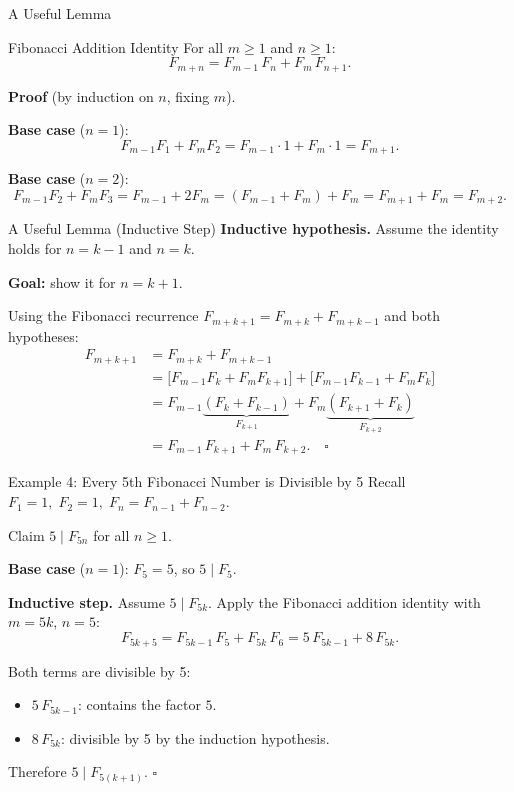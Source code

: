 \documentclass[10pt,aspectratio=169]{beamer}
\begin{document}
\begin{frame}{A Useful Lemma}
  \begin{block}{Fibonacci Addition Identity}
    For all $m \ge 1$ and $n \ge 1$:
    \[
      F_{m+n} = F_{m-1}\,F_n + F_m\,F_{n+1}.
    \]
  \end{block}

  \bigskip
  \textbf{Proof} (by induction on $n$, fixing $m$).

  \bigskip
  \textbf{Base case} ($n = 1$):
  \[
    F_{m-1}F_1 + F_m F_2 = F_{m-1} \cdot 1 + F_m \cdot 1 = F_{m+1}.
  \]

  \textbf{Base case} ($n = 2$):
  \[
    F_{m-1}F_2 + F_m F_3 = F_{m-1} + 2F_m = (F_{m-1}+F_m)+F_m = F_{m+1}+F_m = F_{m+2}.
  \]
\end{frame}

\begin{frame}{A Useful Lemma (Inductive Step)}
  \textbf{Inductive hypothesis.} Assume the identity holds for $n = k-1$ and $n = k$.

  \bigskip
  \textbf{Goal:} show it for $n = k+1$.

  \bigskip
  Using the Fibonacci recurrence $F_{m+k+1} = F_{m+k} + F_{m+k-1}$ and both hypotheses:
  \begin{align*}
    F_{m+k+1}
    &= F_{m+k} + F_{m+k-1} \\
    &= \bigl[F_{m-1}F_k + F_m F_{k+1}\bigr]
     + \bigl[F_{m-1}F_{k-1} + F_m F_k\bigr] \\
    &= F_{m-1}\underbrace{(F_k + F_{k-1})}_{F_{k+1}}
     + F_m\underbrace{(F_{k+1} + F_k)}_{F_{k+2}} \\
    &= F_{m-1}\,F_{k+1} + F_m\,F_{k+2}. \quad \square
  \end{align*}
\end{frame}

\begin{frame}{Example 4: Every 5th Fibonacci Number is Divisible by 5}
  Recall $F_1 = 1,\; F_2 = 1,\; F_n = F_{n-1} + F_{n-2}$.

  \begin{block}{Claim}
    $5 \mid F_{5n}$ for all $n \ge 1$.
  \end{block}

  \bigskip
  \textbf{Base case} ($n = 1$): $F_5 = 5$, so $5 \mid F_5$.

  \bigskip
  \textbf{Inductive step.} Assume $5 \mid F_{5k}$.
  Apply the Fibonacci addition identity with $m = 5k$, $n = 5$:
  \[
    F_{5k+5} = F_{5k-1}\,F_5 + F_{5k}\,F_6
             = 5\,F_{5k-1} + 8\,F_{5k}.
  \]

  \bigskip
  Both terms are divisible by 5:
  \begin{itemize}
    \item $5\,F_{5k-1}$: contains the factor $5$.
    \item $8\,F_{5k}$: divisible by 5 by the induction hypothesis.
  \end{itemize}

  Therefore $5 \mid F_{5(k+1)}$. $\square$
\end{frame}
\end{document}
